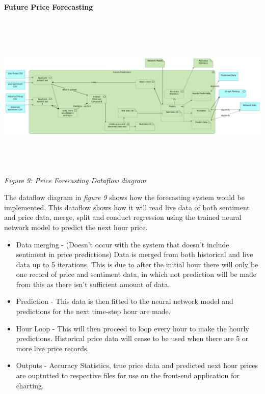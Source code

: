 \documentclass[oneside, 10pt]{article}
\begin{document}
		\textbf{Future Price Forecasting}
		\begin{center}
			\includegraphics[width=18cm,height=8cm]{images/Future_Predictions.png}
			\textit{Figure 9: Price Forecasting Dataflow diagram}
		\end{center}
		The dataflow diagram in \textit{figure 9} shows how the forecasting system would be implemented. This dataflow shows how it will read live data of both sentiment and price data, merge, split and conduct regression using the trained neural network model to predict the next hour price.
		\begin{itemize}
			 \item Data merging - (Doesn't occur with the system that doesn't include sentiment in price predictions) Data is merged from both historical and live data up to 5 iterations. This is due to after the initial hour there will only be one record of price and sentiment data, in which not prediction will be made from this as there isn't sufficient amount of data.
			 \item Prediction - This data is then fitted to the neural network model and predictions for the next time-step hour are made.
			 \item Hour Loop - This will then proceed to loop every hour to make the hourly predictions. Historical price data will cease to be used when there are 5 or more live price records.
			 \item Outputs - Accuracy Statistics, true price data and predicted next hour prices are ouptutted to respective files for use on the front-end application for charting.
		\end{itemize}
	
\end{document}
